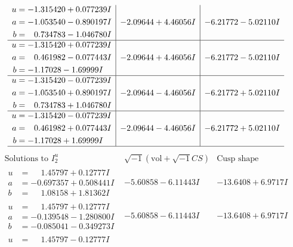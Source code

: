 \documentclass[1p]{elsarticle_modified}
\theoremstyle{definition}
\newcommand{\I}{\sqrt{-1}}
\begin{document}
$$\begin{array}{c|c|c}
\begin{aligned}
u &= -1.315420 + 0.077239 I \\
a &= -1.053540 - 0.890197 I \\
b &= \phantom{-}0.734783 - 1.046780 I\end{aligned}
 & -2.09644 + 4.46056 I & -6.21772 - 5.02110 I \\ \hline\begin{aligned}
u &= -1.315420 + 0.077239 I \\
a &= \phantom{-}0.461982 - 0.077443 I \\
b &= -1.17028 - 1.69999 I\end{aligned}
 & -2.09644 + 4.46056 I & -6.21772 - 5.02110 I \\ \hline\begin{aligned}
u &= -1.315420 - 0.077239 I \\
a &= -1.053540 + 0.890197 I \\
b &= \phantom{-}0.734783 + 1.046780 I\end{aligned}
 & -2.09644 - 4.46056 I & -6.21772 + 5.02110 I \\ \hline\begin{aligned}
u &= -1.315420 - 0.077239 I \\
a &= \phantom{-}0.461982 + 0.077443 I \\
b &= -1.17028 + 1.69999 I\end{aligned}
 & -2.09644 - 4.46056 I & -6.21772 + 5.02110 I\\
 \hline 
 \end{array}$$\newpage$$\begin{array}{c|c|c}  
\text{Solutions to }I^u_{2}& \I (\text{vol} + \sqrt{-1}CS) & \text{Cusp shape}\\
 \hline 
\begin{aligned}
u &= \phantom{-}1.45797 + 0.12777 I \\
a &= -0.697357 + 0.508441 I \\
b &= \phantom{-}1.08158 + 1.81362 I\end{aligned}
 & -5.60858 - 6.11443 I & -13.6408 + 6.9717 I \\ \hline\begin{aligned}
u &= \phantom{-}1.45797 + 0.12777 I \\
a &= -0.139548 - 1.280800 I \\
b &= -0.085041 - 0.349273 I\end{aligned}
 & -5.60858 - 6.11443 I & -13.6408 + 6.9717 I \\ \hline\begin{aligned}
u &= \phantom{-}1.45797 - 0.12777 I \\

\end{aligned}
\end{array}$$
\end{document}
